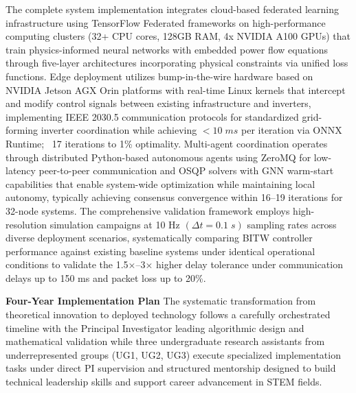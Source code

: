 \documentclass[12pt]{article}
\begin{document}
The complete system implementation integrates cloud-based federated learning infrastructure using TensorFlow Federated frameworks on high-performance computing clusters (32+ CPU cores, 128GB RAM, 4x NVIDIA A100 GPUs) that train physics-informed neural networks with embedded power flow equations through five-layer architectures incorporating physical constraints via unified loss functions. Edge deployment utilizes bump-in-the-wire hardware based on NVIDIA Jetson AGX Orin platforms with real-time Linux kernels that intercept and modify control signals between existing infrastructure and inverters, implementing IEEE 2030.5 communication protocols for standardized grid-forming inverter coordination while achieving $<10\;ms$ per iteration via ONNX Runtime; ~17 iterations to 1\% optimality. Multi-agent coordination operates through distributed Python-based autonomous agents using ZeroMQ for low-latency peer-to-peer communication and OSQP solvers with GNN warm-start capabilities that enable system-wide optimization while maintaining local autonomy, typically achieving consensus convergence within 16--19 iterations for 32-node systems. The comprehensive validation framework employs high-resolution simulation campaigns at 10 Hz $(\Delta t=0.1\;s)$ sampling rates across diverse deployment scenarios, systematically comparing BITW controller performance against existing baseline systems under identical operational conditions to validate the 1.5×--3× higher delay tolerance under communication delays up to 150 ms and packet loss up to 20\%.

\textbf{Four-Year Implementation Plan} The systematic transformation from theoretical innovation to deployed technology follows a carefully orchestrated timeline with the Principal Investigator leading algorithmic design and mathematical validation while three undergraduate research assistants from underrepresented groups (UG1, UG2, UG3) execute specialized implementation tasks under direct PI supervision and structured mentorship designed to build technical leadership skills and support career advancement in STEM fields.
\end{document}
